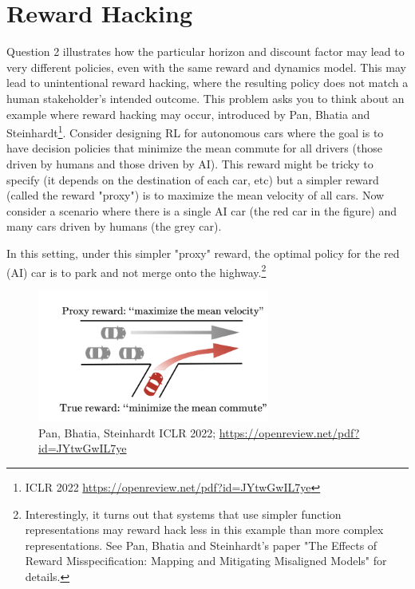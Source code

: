 \section{Reward Hacking}

Question 2 illustrates how the particular  horizon and discount factor may lead 
to very different policies, even with the same reward and dynamics model. This may lead to unintentional reward hacking, where the resulting policy does not match a human stakeholder's intended outcome. This problem asks you to think about an example where reward hacking may occur, introduced by Pan, Bhatia and Steinhardt\footnote{ICLR 2022 \url{https://openreview.net/pdf?id=JYtwGwIL7ye}}. Consider designing RL for autonomous cars where the goal is to have decision policies that minimize the mean commute for all drivers (those driven by humans and those driven by AI). This reward might be tricky to specify (it depends on the destination of each car, etc) but a simpler reward (called the reward "proxy") is to maximize the mean velocity of all cars. Now consider a scenario where there is a single AI car (the red car in the figure) and many cars driven by humans (the grey car). 

In this setting, under this simpler "proxy" reward, the optimal policy for the red (AI) car is to park and not merge onto the highway.\footnote{Interestingly, it turns out that systems that use simpler function representations may reward hack less in this example than more complex representations. See Pan, Bhatia and Steinhardt's paper "The Effects of Reward Misspecification: Mapping and Mitigating Misaligned Models" for details.}

\begin{figure}[h]
    \centering
    \includegraphics[width=3in]{images/commute_time}
    \caption{Pan, Bhatia, Steinhardt ICLR 2022; \url{https://openreview.net/pdf?id=JYtwGwIL7ye}}
    \label{fig:commute}
\end{figure}

\begin{enumerate}[(a)]

	

	

\end{enumerate}
